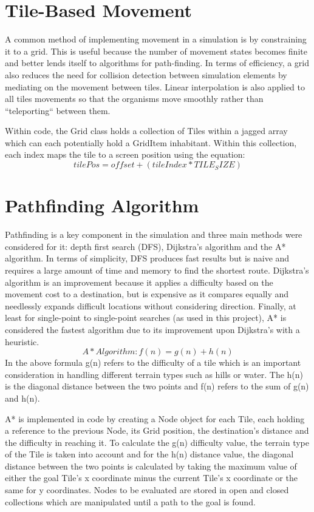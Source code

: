 \documentclass[a4paper, oneside, 11pt]{report}
\begin{document}
\section{Tile-Based Movement}\label{grid}
A common method of implementing movement in a simulation is by constraining it to a grid. This is useful because the number of movement states becomes finite and better lends itself to algorithms for path-finding. In terms of efficiency, a grid also reduces the need for collision detection between simulation elements by mediating on the movement between tiles. Linear interpolation is also applied to all tiles movements so that the organisms move smoothly rather than ``teleporting`` between them.

Within code, the Grid class holds a collection of Tiles within a jagged array which can each potentially hold a GridItem inhabitant. Within this collection, each index maps the tile to a screen position using the equation:
\[tilePos = offset + (tileIndex * TILE_SIZE)\]

\section{Pathfinding Algorithm}\label{pathfinding}
Pathfinding is a key component in the simulation and three main methods were considered for it: depth first search (DFS), Dijkstra's algorithm and the A* algorithm. In terms of simplicity, DFS produces fast results but is naive and requires a large amount of time and memory to find the shortest route. Dijkstra's algorithm is an improvement because it applies a difficulty based on the movement cost to a destination, but is expensive as it compares equally and needlessly expands difficult locations without considering direction. Finally, at least for single-point to single-point searches (as used in this project), A* is considered the fastest algorithm \cite{belwariar} due to its improvement upon Dijkstra's with a heuristic. 
\[A* Algorithm: f(n) = g(n) + h(n)\]
In the above formula g(n) refers to the difficulty of a tile which is an important consideration in handling different terrain types such as hills or water. The h(n) is the diagonal distance between the two points and f(n) refers to the sum of g(n) and h(n).

A* is implemented in code by creating a Node object for each Tile, each holding a reference to the previous Node, its Grid position, the destination's distance and the difficulty in reaching it. To calculate the g(n) difficulty value, the terrain type of the Tile is taken into account and for the h(n) distance value, the diagonal distance between the two points is calculated by taking the maximum value of either the goal Tile's x coordinate minus the current Tile's x coordinate or the same for y coordinates. Nodes to be evaluated are stored in open and closed collections which are manipulated until a path to the goal is found.
\end{document}
